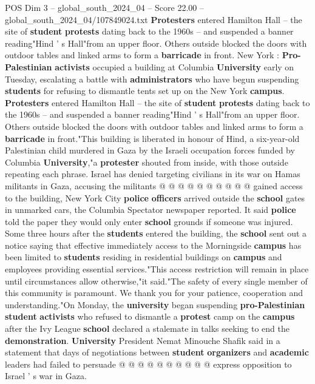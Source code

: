 \begin{textsample}{POS Dim 3 – global\_south\_2024\_04 – Score 22.00 – global\_south\_2024\_04/107849024.txt}  \label{ex:f3_pos_212}
\textbf{Protesters} entered Hamilton Hall -- the site of \textbf{student} \textbf{protests} dating back to the 1960s -- and suspended a banner reading"Hind ' s Hall"from an upper floor.
Others outside blocked the doors with outdoor tables and linked arms to form a \textbf{barricade} in front.
New York : \textbf{Pro-Palestinian} \textbf{activists} occupied a building at Columbia \textbf{University} early on Tuesday, escalating a battle with \textbf{administrators} who have begun suspending \textbf{students} for refusing to dismantle tents set up on the New York \textbf{campus}. \textbf{Protesters} entered Hamilton Hall -- the site of \textbf{student} \textbf{protests} dating back to the 1960s -- and suspended a banner reading"Hind ' s Hall"from an upper floor.
Others outside blocked the doors with outdoor tables and linked arms to form a \textbf{barricade} in front."This building is liberated in honour of Hind, a six-year-old Palestinian child murdered in Gaza by the Israeli occupation forces funded by Columbia \textbf{University},"a \textbf{protester} shouted from inside, with those outside repeating each phrase.
Israel has denied targeting civilians in its war on Hamas militants in Gaza, accusing the militants @ @ @ @ @ @ @ @ @ @ gained access to the building, New York City \textbf{police} \textbf{officers} arrived outside the \textbf{school} gates in unmarked cars, the Columbia Spectator newspaper reported.
It said \textbf{police} told the paper they would only enter \textbf{school} grounds if someone was injured.
Some three hours after the \textbf{students} entered the building, the \textbf{school} sent out a notice saying that effective immediately access to the Morningside \textbf{campus} has been limited to \textbf{students} residing in residential buildings on \textbf{campus} and employees providing essential services."This access restriction will remain in place until circumstances allow otherwise,"it said."The safety of every single member of this community is paramount.
We thank you for your patience, cooperation and understanding."On Monday, the \textbf{university} began suspending \textbf{pro-Palestinian} \textbf{student} \textbf{activists} who refused to dismantle a \textbf{protest} camp on the \textbf{campus} after the Ivy League \textbf{school} declared a stalemate in talks seeking to end the \textbf{demonstration}. \textbf{University} President Nemat Minouche Shafik said in a statement that days of negotiations between \textbf{student} \textbf{organizers} and \textbf{academic} leaders had failed to persuade @ @ @ @ @ @ @ @ @ @ express opposition to Israel ' s war in Gaza.

\end{textsample}
